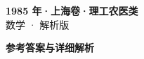 \documentclass[zihao=-4, a4paper]{ctexart}
\begin{document}
\begin{center}
  {\Large\bfseries 1985 年·上海卷·理工农医类}\\[4pt]
  {\large 数学 · 解析版}
\end{center}
\medskip
{}

\clearpage
{}
\begin{center}{\Large\bfseries 参考答案与详细解析}\end{center}
\medskip

\end{document}
